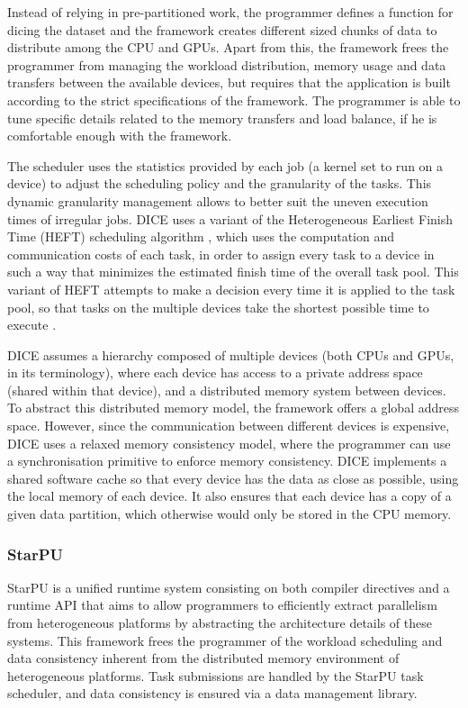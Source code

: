 Instead of relying in pre-partitioned work, the programmer defines a function for dicing the dataset and the framework creates different sized chunks of data to distribute among the CPU and GPUs. Apart from this, the framework frees the programmer from managing the workload distribution, memory usage and data transfers between the available devices, but requires that the application is built according to the strict specifications of the framework. The programmer is able to tune specific details related to the memory transfers and load balance, if he is comfortable enough with the framework.

The scheduler uses the statistics provided by each job (a kernel set to run on a device) to adjust the scheduling policy and the granularity of the tasks. This dynamic granularity management allows to better suit the uneven execution times of irregular jobs. DICE uses a variant of the Heterogeneous Earliest Finish Time (HEFT) scheduling algorithm \cite{HEFT}, which uses the computation and communication costs of each task, in order to assign every task to a device in such a way that minimizes the estimated finish time of the overall task pool. This variant of HEFT attempts to make a decision every time it is applied to the task pool, so that tasks on the multiple devices take the shortest possible time to execute \cite{Msc:Mariano}.

DICE assumes a hierarchy composed of multiple devices (both CPUs and GPUs, in its terminology), where each device has access to a private address space (shared within that device), and a distributed memory system between devices. To abstract this distributed memory model, the framework offers a global address space. However, since the communication between different devices is expensive, DICE uses a relaxed memory consistency model, where the programmer can use a synchronisation primitive to enforce memory consistency. DICE implements a shared software cache so that every device has the data as close as possible, using the local memory of each device. It also ensures that each device has a copy of a given data partition, which otherwise would only be stored in the CPU memory.


\subsubsection*{StarPU}

StarPU \cite{STARPU} is a unified runtime system consisting on both compiler directives and a runtime API that aims to allow programmers to efficiently extract parallelism from heterogeneous platforms by abstracting the architecture details of these systems. This framework frees the programmer of the workload scheduling and data consistency inherent from the distributed memory environment of heterogeneous platforms. Task submissions are handled by the StarPU task scheduler, and data consistency is ensured via a data management library.

